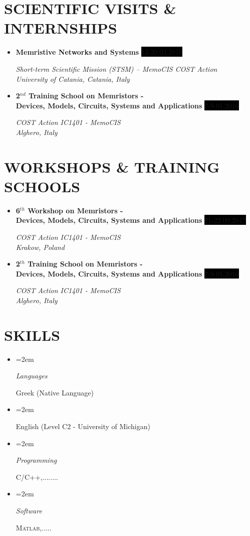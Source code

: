 \documentclass[paper=a4,fontsize=11pt]{scrartcl} %
\newlength{\spacebox}
\newcommand{\sepspace}{\vspace*{1em}}		%
\newcommand{\NewPart}[1]{\section*{\uppercase{#1}}}
\newcommand{\PersonalEntry}[2]{
		\noindent\hangindent=2em\hangafter=0 %
		\parbox{\spacebox}{        %
		\textit{#1}}		       %
		\hspace{1.5em} #2 \par}    %
\newcommand{\SkillsEntry}[2]{      %
		\noindent\hangindent=2em\hangafter=0 %
		\parbox{2\spacebox}{        %
		\textit{#1}}			   %
		\hspace{1.5em} #2 \par}    %
\newcommand{\MiscEntry}[2]{
		\noindent \textbf{#1} \par      %
		\noindent \textit{#2} \par              %
		\normalsize \par}
\newcommand{\MiscEntryDate}[3]{
		\noindent \textbf{#1} \hfill      %
		\colorbox{Black}{\color{White}#2} \par  %
		\noindent \textit{#3} \par              %
		\normalsize \par}
\begin{document}
\NewPart{Scientific Visits \& Internships}

\begin{itemize}[leftmargin=*]
    \item \MiscEntryDate{Memristive Networks and Systems}{\footnotesize 13-20.03.2016}{Short-term Scientific Mission (STSM) – MemoCIS COST Action\\University of Catania, Catania, Italy}
    \sepspace
    \item \MiscEntryDate{2$^{nd}$ Training School on Memristors - \\Devices, Models, Circuits, Systems and Applications}{\footnotesize 7-9.05.2016}{COST Action IC1401 - MemoCIS \\Alghero, Italy}
\end{itemize}
\sepspace

\NewPart{Workshops \& Training Schools}

\begin{itemize}[leftmargin=*]
    \item \MiscEntryDate{6$^{th}$ Workshop on Memristors - \\Devices, Models, Circuits, Systems and Applications}{\footnotesize 21-22.09.2017}{COST Action IC1401 - MemoCIS \\Krakow, Poland}
    \item \MiscEntryDate{2$^{th}$ Training School on Memristors - \\Devices, Models, Circuits, Systems and Applications}{\footnotesize 7-9.05.2016}{COST Action IC1401 - MemoCIS \\Alghero, Italy}
\end{itemize}
\sepspace





\NewPart{Skills}

\begin{itemize}
    \item[] \SkillsEntry{Languages}{Greek (Native Language)}
    \item[] \SkillsEntry{}{English (Level C2 - University of Michigan)}
    \item[] \SkillsEntry{Programming}{\textsc{C/C++},........}
    \item[] \SkillsEntry{Software}{\textsc{Matlab},.....}
\end{itemize}
\sepspace
\end{document}
